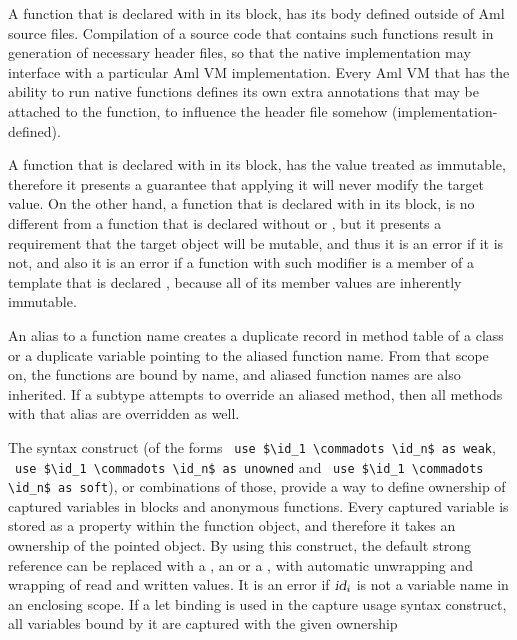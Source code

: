 A function that is declared with  in its  block, has its body defined outside of Aml source files. Compilation of a source code that contains such functions result in generation of necessary header files, so that the native implementation may interface with a particular Aml VM implementation. Every Aml VM that has the ability to run native functions defines its own extra annotations that may be attached to the function, to influence the header file somehow (implementation-defined). 

A function that is declared with  in its  block, has the  value treated as immutable, therefore it presents a guarantee that applying it will never modify the target value. On the other hand, a function that is declared with  in its  block, is no different from a function that is declared without  or , but it presents a requirement that the target object will be mutable, and thus it is an error if it is not, and also it is an error if a function with such modifier is a member of a template that is declared , because all of its member values are inherently immutable. 

An alias to a function name creates a duplicate record in method table of a class or a duplicate variable pointing to the aliased function name. From that scope on, the functions are bound by name, and aliased function names are also inherited. If a subtype attempts to override an aliased method, then all methods with that alias are overridden as well. 

The  syntax construct (of the forms ~\lstinline{use $\id_1 \commadots \id_n$ as weak}, ~\lstinline{use $\id_1 \commadots \id_n$ as unowned} and ~\lstinline{use $\id_1 \commadots \id_n$ as soft}), or combinations of those, provide a way to define ownership of captured variables in blocks and anonymous functions. Every captured variable is stored as a property within the function object, and therefore it takes an ownership of the pointed object. By using this construct, the default strong reference can be replaced with a , an  or a , with automatic unwrapping and wrapping of read and written values. It is an error if $\mbox{\sl id}_i$ is not a variable name in an enclosing scope. If a let binding is used in the capture usage syntax construct, all variables bound by it are captured with the given ownership






